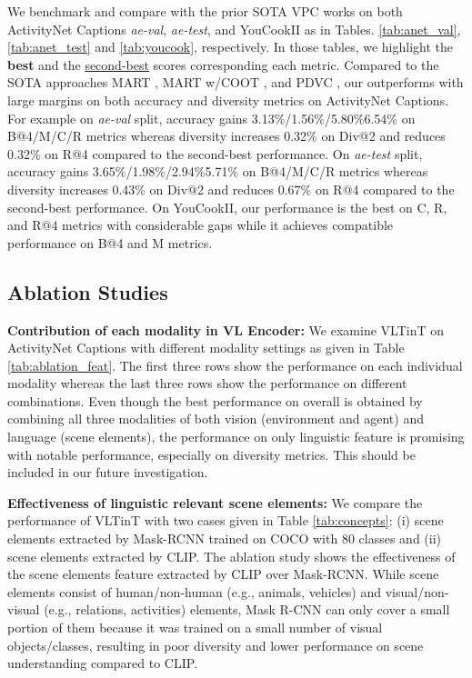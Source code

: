 \documentclass[letterpaper]{article} \usepackage{aaai23}  \usepackage{times}  \usepackage{helvet}  \usepackage{courier}  \usepackage[hyphens]{url}  \usepackage{graphicx} \urlstyle{rm} \def\UrlFont{\rm}  \usepackage{natbib}  \usepackage{caption} \frenchspacing  \setlength{\pdfpagewidth}{8.5in}  \setlength{\pdfpageheight}{11in}  \usepackage{algorithm}
\newcommand{\encoder}{VL Encoder\xspace}
\begin{document}
We benchmark and compare \model with the prior SOTA VPC works on both ActivityNet Captions \textit{ae-val}, \textit{ae-test}, and YouCookII as in Tables. \ref{tab:anet_val}, \ref{tab:anet_test} and  \ref{tab:youcook}, respectively. In those tables, we highlight the \textbf{best} and the \underline{second-best} scores corresponding each metric. Compared to the SOTA approaches MART \cite{lei2020mart}, MART w/COOT \cite{ging2020coot}, and PDVC \cite{wang2021end}, our \model outperforms with large margins on both accuracy and diversity metrics on ActivityNet Captions. For example on \textit{ae-val} split, accuracy gains 3.13\%/1.56\%/5.80\%6.54\% on B@4/M/C/R metrics whereas diversity increases 0.32\% on Div@2 and reduces 0.32\% on R@4 compared to the second-best performance. On \textit{ae-test} split, accuracy gains 3.65\%/1.98\%/2.94\%5.71\% on B@4/M/C/R metrics whereas diversity increases 0.43\% on Div@2 and reduces 0.67\% on R@4 compared to the second-best performance. On YouCookII, our performance is the best on C, R, and R@4 metrics with considerable gaps while it achieves compatible performance on B@4 and M metrics. 

\subsection{Ablation Studies}



\vspace{2mm}
\noindent
\textbf{ Contribution of each modality in \encoder:} We examine VLTinT on ActivityNet Captions with different modality settings as given in Table \ref{tab:ablation_feat}. The first three rows show the performance on each individual modality whereas the last three rows show the performance on different combinations. Even though the best performance on overall is obtained by combining all three modalities of both vision (environment and agent) and language (scene elements), the performance on only linguistic feature is promising with notable performance, especially on diversity metrics. This should be included in our future investigation.














\vspace{2mm}
\noindent
\textbf{ Effectiveness of linguistic relevant scene elements:}
We compare the performance of VLTinT with two cases given in Table \ref{tab:concepts}: (i) scene elements extracted by Mask-RCNN trained on COCO with 80 classes \cite{MaskRCNN_ICCV17} and (ii) scene elements extracted by CLIP. The ablation study shows the effectiveness of the scene elements feature extracted by CLIP over Mask-RCNN. 
While scene elements consist of human/non-human (e.g., animals, vehicles) and visual/non-visual (e.g., relations, activities) elements, Mask R-CNN can only cover a small portion of them because it was trained on a small number of visual objects/classes, resulting in poor diversity and lower performance on scene understanding compared to CLIP. 
\end{document}
